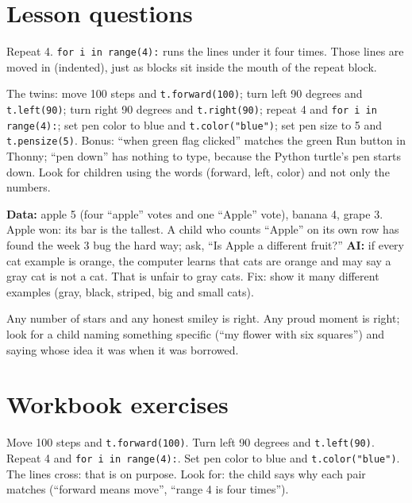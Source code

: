 
\section{Lesson questions}
\begin{answer}
Repeat 4. \texttt{for i in range(4):} runs the lines under it four times. Those lines are moved in (indented), just as blocks sit inside the mouth of the repeat block.
\end{answer}

\begin{answer}
The twins: move 100 steps and \texttt{t.forward(100)}; turn left 90 degrees and \texttt{t.left(90)}; turn right 90 degrees and \texttt{t.right(90)}; repeat 4 and \texttt{for i in range(4):}; set pen color to blue and \texttt{t.color("blue")}; set pen size to 5 and \texttt{t.pensize(5)}. Bonus: \enquote{when green flag clicked} matches the green Run button in Thonny; \enquote{pen down} has nothing to type, because the Python turtle's pen starts down. Look for children using the words (forward, left, color) and not only the numbers.
\end{answer}

\begin{answer}
\textbf{Data:} apple 5 (four \enquote{apple} votes and one \enquote{Apple} vote), banana 4, grape 3. Apple won: its bar is the tallest. A child who counts \enquote{Apple} on its own row has found the week 3 bug the hard way; ask, \enquote{Is Apple a different fruit?} \textbf{AI:} if every cat example is orange, the computer learns that cats are orange and may say a gray cat is not a cat. That is unfair to gray cats. Fix: show it many different examples (gray, black, striped, big and small cats).
\end{answer}

\begin{answer}
Any number of stars and any honest smiley is right. Any proud moment is right; look for a child naming something specific (\enquote{my flower with six squares}) and saying whose idea it was when it was borrowed.
\end{answer}

\section{Workbook exercises}
\begin{answer}
Move 100 steps and \texttt{t.forward(100)}. Turn left 90 degrees and \texttt{t.left(90)}. Repeat 4 and \texttt{for i in range(4):}. Set pen color to blue and \texttt{t.color("blue")}. The lines cross: that is on purpose. Look for: the child says why each pair matches (\enquote{forward means move}, \enquote{range 4 is four times}).
\end{answer}

